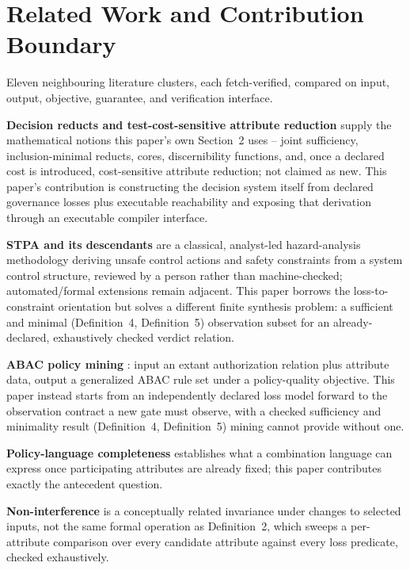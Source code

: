 \documentclass[11pt,a4paper]{article}
\theoremstyle{definition}
\begin{document}
\section{Related Work and Contribution Boundary}
\label{sec:relatedwork}

Eleven neighbouring literature clusters, each fetch-verified, compared on input, output, objective, guarantee, and verification interface.

\textbf{Decision reducts and test-cost-sensitive attribute reduction} \cite{pawlak-rough-sets-1982,skowron-rauszer-discernibility-1992,min-test-cost-sensitive-reduction-2011} supply the mathematical notions this paper's own Section~2 uses -- joint sufficiency, inclusion-minimal reducts, cores, discernibility functions, and, once a declared cost is introduced, cost-sensitive attribute reduction; not claimed as new. This paper's contribution is constructing the decision system itself from declared governance losses plus executable reachability and exposing that derivation through an executable compiler interface.

\textbf{STPA and its descendants} \cite{stpa-handbook,stpa-sec} are a classical, analyst-led hazard-analysis methodology deriving unsafe control actions and safety constraints from a system control structure, reviewed by a person rather than machine-checked; automated/formal extensions \cite{phase-rismani-2024,mylius-2025,deepstpa} remain adjacent. This paper borrows the loss-to-constraint orientation but solves a different finite synthesis problem: a sufficient and minimal (Definition~4, Definition~5) observation subset for an already-declared, exhaustively checked verdict relation.

\textbf{ABAC policy mining} \cite{xu-stoller-abac-mining,abac-mining-survey-2022}: input an extant authorization relation plus attribute data, output a generalized ABAC rule set under a policy-quality objective. This paper instead starts from an independently declared loss model forward to the observation contract a new gate must observe, with a checked sufficiency and minimality result (Definition~4, Definition~5) mining cannot provide without one.

\textbf{Policy-language completeness} \cite{ptacl,sacmat16-completeness} establishes what a combination language can express once participating attributes are already fixed; this paper contributes exactly the antecedent question.

\textbf{Non-interference} \cite{goguen-meseguer-1982} is a conceptually related invariance under changes to selected inputs, not the same formal operation as Definition~2, which sweeps a per-attribute comparison over every candidate attribute against every loss predicate, checked exhaustively.
\end{document}
